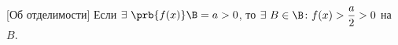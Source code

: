 [Об отделимости]\label{A2b}
 	Если $\exists\  \prb{f(x)}\B=a>0$, то $\exists\  B\in \B\colon f(x)>\dfrac a2>0$ на $B$.
 